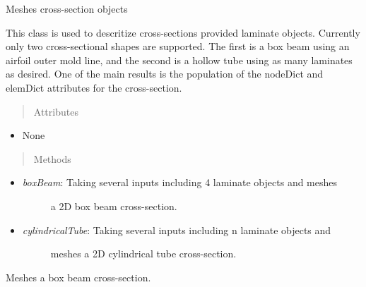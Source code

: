 \documentclass[letterpaper,10pt,english]{sphinxmanual}
\begin{document}
\begin{fulllineitems}
\label{structures:AeroComBAT.Structures.Mesher}
Meshes cross-section objects

This class is used to descritize cross-sections provided laminate objects.
Currently only two cross-sectional shapes are supported. The first is a
box beam using an airfoil outer mold line, and the second is a hollow tube
using as many laminates as desired. One of the main results is the
population of the nodeDict and elemDict attributes for the cross-section.
\begin{quote}\begin{description}
\item[{Attributes}] \leavevmode
\end{description}\end{quote}
\begin{itemize}
\item {} 
None

\end{itemize}
\begin{quote}\begin{description}
\item[{Methods}] \leavevmode
\end{description}\end{quote}
\begin{itemize}
\item {} \begin{description}
\item[{\emph{boxBeam}: Taking several inputs including 4 laminate objects and meshes}] \leavevmode
a 2D box beam cross-section.

\end{description}

\item {} \begin{description}
\item[{\emph{cylindricalTube}: Taking several inputs including n laminate objects and}] \leavevmode
meshes a 2D cylindrical tube cross-section.

\end{description}

\end{itemize}

\begin{fulllineitems}
\label{structures:AeroComBAT.Structures.Mesher.boxBeam}
Meshes a box beam cross-section.


\end{fulllineitems}
\end{fulllineitems}
\end{document}
